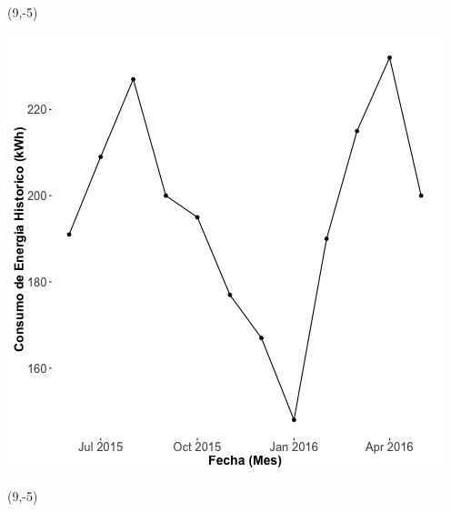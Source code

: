 \documentclass{article}\usepackage[]{graphicx}\usepackage[]{color}
\newenvironment{knitrout}{}{} %
\begin{document}
 \begin{textblock}{1}(9,-5)
\begin{minipage}{20em}
\begingroup

\endgroup
\end{minipage}
\end{textblock}

\begin{knitrout}
\color{fgcolor}
\includegraphics[scale=0.65]{figure/A25_historico_energia} 
\end{knitrout}

 \begin{textblock}{1}(9,-5)
\begin{minipage}{20em}
\begingroup

\endgroup
\end{minipage}
\end{textblock}
\end{document}
